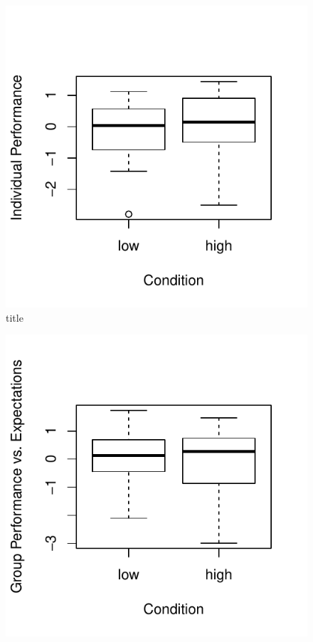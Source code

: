 \begin{figure}
  \includegraphics{images/indComponentPerformancePostBoxPlot-1}
  \caption{title}
    \label{fig:indComponentPerformancePostBoxPlot}
\end{figure}

\begin{figure}
  \centering
  \includegraphics{images/groupPerfExpPostBoxPlot-1}
          \label{fig:groupPerfExpPostBoxPlot}
\end{figure}



